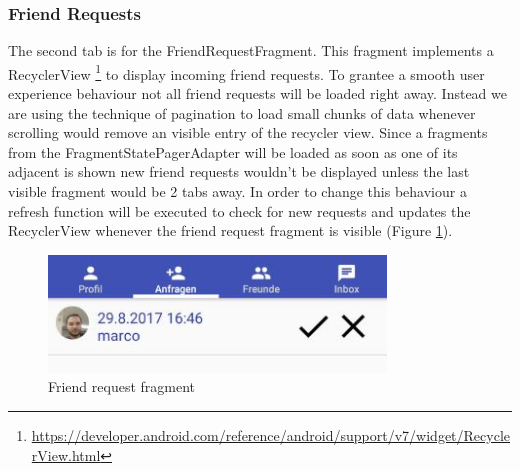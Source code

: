 \subsubsection{Friend Requests}
The second tab is for the FriendRequestFragment. This fragment implements a RecyclerView \footnote{\url{https://developer.android.com/reference/android/support/v7/widget/RecyclerView.html}} to display incoming friend requests. To grantee a smooth user experience behaviour not all friend requests will be loaded right away. Instead we are using the technique of pagination to load small chunks of data whenever scrolling would remove an visible entry of the recycler view. Since a fragments from the FragmentStatePagerAdapter will be loaded as soon as one of its adjacent is shown new friend requests wouldn't be displayed unless the last visible fragment would be 2 tabs away. In order to change this behaviour a refresh function will be executed to check for new requests and updates the RecyclerView whenever the friend request fragment is visible  (Figure \ref{fig:friend_request}).
\begin{figure}[htbp]
	\includegraphics[width=0.8\textwidth]{images/friend_request.jpg}
	\centering
	\caption{Friend request fragment}\label{fig:friend_request}
\end{figure} 

